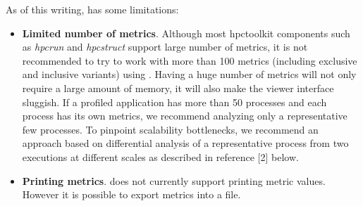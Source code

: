 As of this writing, \hpcviewer{} has some limitations:
\begin{itemize}

\item \textbf{Limited number of metrics}.
  Although most hpctoolkit components such as \textit{hpcrun} and \textit{hpcstruct} support large number of metrics, it is not recommended to try to work with more than 100 metrics (including exclusive and inclusive variants) using \hpcviewer{}.
  Having a huge number of metrics will not only require a large amount of memory, it will also make the viewer interface sluggish.
  If a profiled application has more than 50 processes and each process has its own metrics, we recommend analyzing only a representative few processes.
  To pinpoint scalability bottlenecks, we recommend an approach based on differential analysis of a representative process from two executions at different scales as described in reference [2] below.

\item \textbf{Printing metrics}.
  \hpcviewer{} does not currently support printing metric values.
  However it is possible to export metrics into a file.

\end{itemize}
